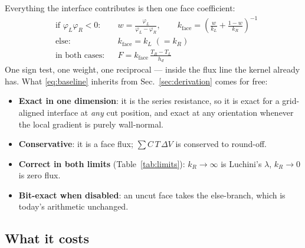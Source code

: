 \documentclass[11pt,a4paper]{article}
\begin{document}
Everything the interface contributes is then one face coefficient:
\begin{equation}
  \boxed{\;
  \begin{aligned}
    &\text{if } \varphi_L\varphi_R<0:
      &&w=\frac{\varphi_L}{\varphi_L-\varphi_R},
      \qquad
      k_{\text{face}}=\left(\frac{w}{k_L}+\frac{1-w}{k_R}\right)^{-1} \\[1mm]
    &\text{else:} &&k_{\text{face}}=k_L\;(=k_R) \\[1mm]
    &\text{in both cases:} &&F=k_{\text{face}}\,\frac{T_R-T_L}{h_d}
  \end{aligned}
  \;}
  \label{eq:baseline}
\end{equation}
One sign test, one weight, one reciprocal --- inside the flux line the kernel
already has. What \eqref{eq:baseline} inherits from Sec.~\ref{sec:derivation}
comes for free:
\begin{itemize}
\item \textbf{Exact in one dimension}: it is the series resistance, so it is
      exact for a grid-aligned interface at \emph{any} cut position, and exact
      at any orientation whenever the local gradient is purely wall-normal.
\item \textbf{Conservative}: it is a face flux; $\sum C\,T\,\Delta V$ is
      conserved to round-off.
\item \textbf{Correct in both limits} (Table~\ref{tab:limits}):
      $k_R\to\infty$ is Luchini's $\lambda$, $k_R\to0$ is zero flux.
\item \textbf{Bit-exact when disabled}: an uncut face takes the else-branch,
      which is today's arithmetic unchanged.
\end{itemize}

\subsection{What it costs}
\label{sec:cost}
\end{document}
